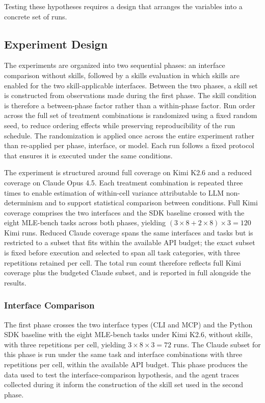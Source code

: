 \documentclass[
english,                 %
bibtex,                  %
includeExtraAbstracts, %
]{kththesis}
\numberwithin{listing}{chapter}
\begin{document}
Testing these hypotheses requires a design that arranges the variables into a concrete set of runs.

\subsection{Experiment Design}

The experiments are organized into two sequential phases: an interface comparison without skills, followed by a skills evaluation in which skills are enabled for the two skill-applicable interfaces. Between the two phases, a skill set is constructed from observations made during the first phase. The skill condition is therefore a between-phase factor rather than a within-phase factor. Run order across the full set of treatment combinations is randomized using a fixed random seed, to reduce ordering effects while preserving reproducibility of the run schedule. The randomization is applied once across the entire experiment rather than re-applied per phase, interface, or model. Each run follows a fixed protocol that ensures it is executed under the same conditions.

The experiment is structured around full coverage on Kimi K2.6 and a reduced coverage on Claude Opus 4.5. Each treatment combination is repeated three times to enable estimation of within-cell variance attributable to \gls{LLM} non-determinism and to support statistical comparison between conditions. Full Kimi coverage comprises the two interfaces and the \gls{SDK} baseline crossed with the eight \gls{MLE}-bench tasks across both phases, yielding $(3 \times 8 + 2 \times 8) \times 3 = 120$ Kimi runs. Reduced Claude coverage spans the same interfaces and tasks but is restricted to a subset that fits within the available \gls{API} budget; the exact subset is fixed before execution and selected to span all task categories, with three repetitions retained per cell. The total run count therefore reflects full Kimi coverage plus the budgeted Claude subset, and is reported in full alongside the results.

\subsubsection{Interface Comparison}

The first phase crosses the two interface types (\gls{CLI} and \gls{MCP}) and the Python \gls{SDK} baseline with the eight \gls{MLE}-bench tasks under Kimi K2.6, without skills, with three repetitions per cell, yielding $3 \times 8 \times 3 = 72$ runs. The Claude subset for this phase is run under the same task and interface combinations with three repetitions per cell, within the available \gls{API} budget. This phase produces the data used to test the interface-comparison hypothesis, and the agent traces collected during it inform the construction of the skill set used in the second phase.
\end{document}
